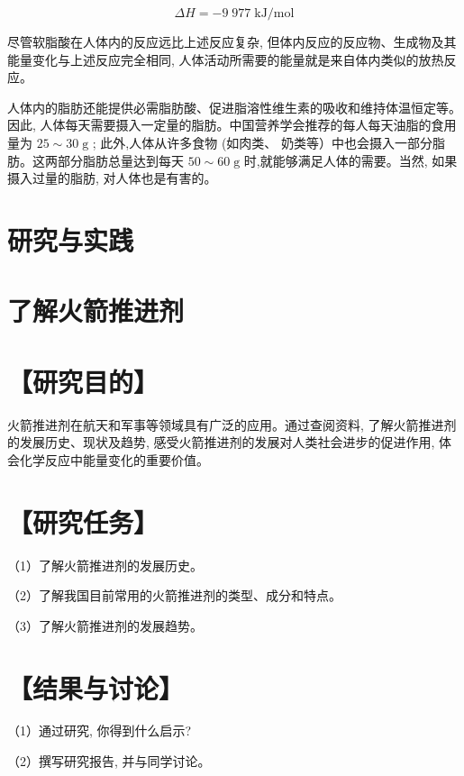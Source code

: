 \documentclass[10pt]{article}
\begin{document}
\[
{\Delta H} = - 9\;{977}\;\mathrm{{kJ}}/\mathrm{{mol}}
\]

尽管软脂酸在人体内的反应远比上述反应复杂, 但体内反应的反应物、生成物及其能量变化与上述反应完全相同, 人体活动所需要的能量就是来自体内类似的放热反应。

人体内的脂肪还能提供必需脂肪酸、促进脂溶性维生素的吸收和维持体温恒定等。 因此, 人体每天需要摄入一定量的脂肪。中国营养学会推荐的每人每天油脂的食用量为 \({25} \sim {30}\mathrm{\;g}\) ; 此外,人体从许多食物 (如肉类、 奶类等）中也会摄入一部分脂肪。这两部分脂肪总量达到每天 \({50} \sim {60}\mathrm{\;g}\) 时,就能够满足人体的需要。当然, 如果摄入过量的脂肪, 对人体也是有害的。

\section*{研究与实践}

\section*{了解火箭推进剂}

\section*{【研究目的】}

火箭推进剂在航天和军事等领域具有广泛的应用。通过查阅资料, 了解火箭推进剂的发展历史、现状及趋势, 感受火箭推进剂的发展对人类社会进步的促进作用, 体会化学反应中能量变化的重要价值。

\section*{【研究任务】}

（1）了解火箭推进剂的发展历史。

（2）了解我国目前常用的火箭推进剂的类型、成分和特点。

（3）了解火箭推进剂的发展趋势。

\section*{【结果与讨论】}

（1）通过研究, 你得到什么启示?

（2）撰写研究报告, 并与同学讨论。
\end{document}
